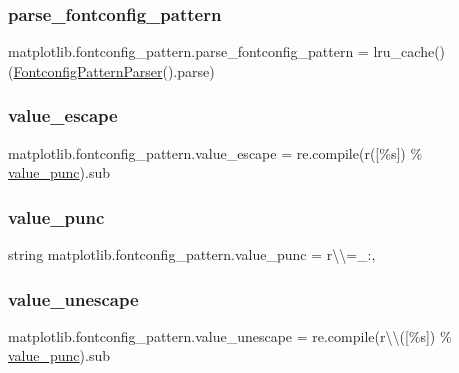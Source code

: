 \subsubsection{\texorpdfstring{parse\+\_\+fontconfig\+\_\+pattern}{parse\_fontconfig\_pattern}}
{\footnotesize\ttfamily matplotlib.\+fontconfig\+\_\+pattern.\+parse\+\_\+fontconfig\+\_\+pattern = lru\+\_\+cache()(\hyperlink{classmatplotlib_1_1fontconfig__pattern_1_1FontconfigPatternParser}{Fontconfig\+Pattern\+Parser}().parse)}

\mbox{\label{namespacematplotlib_1_1fontconfig__pattern_a70dd2600dcde40804ff2edc53f5d8157}} 
\subsubsection{\texorpdfstring{value\+\_\+escape}{value\_escape}}
{\footnotesize\ttfamily matplotlib.\+fontconfig\+\_\+pattern.\+value\+\_\+escape = re.\+compile(r\textquotesingle{}(\mbox{[}\%s\mbox{]})\textquotesingle{} \% \hyperlink{namespacematplotlib_1_1fontconfig__pattern_acb250aed669612c4beeffe27db8a2695}{value\+\_\+punc}).sub}

\mbox{\label{namespacematplotlib_1_1fontconfig__pattern_acb250aed669612c4beeffe27db8a2695}} 
\subsubsection{\texorpdfstring{value\+\_\+punc}{value\_punc}}
{\footnotesize\ttfamily string matplotlib.\+fontconfig\+\_\+pattern.\+value\+\_\+punc = r\textquotesingle{}\textbackslash{}\textbackslash{}=\+\_\+\+:,\textquotesingle{}}

\mbox{\label{namespacematplotlib_1_1fontconfig__pattern_a300528c498890d20349896d13b41ca21}} 
\subsubsection{\texorpdfstring{value\+\_\+unescape}{value\_unescape}}
{\footnotesize\ttfamily matplotlib.\+fontconfig\+\_\+pattern.\+value\+\_\+unescape = re.\+compile(r\textquotesingle{}\textbackslash{}\textbackslash{}(\mbox{[}\%s\mbox{]})\textquotesingle{} \% \hyperlink{namespacematplotlib_1_1fontconfig__pattern_acb250aed669612c4beeffe27db8a2695}{value\+\_\+punc}).sub}

